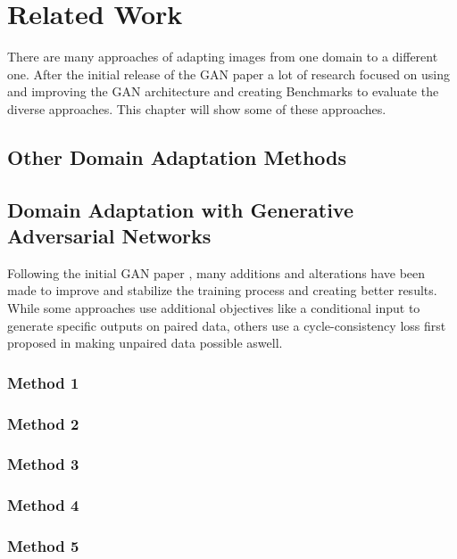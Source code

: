 \chapter{Related Work}
\label{sec:related_work}

There are many approaches of adapting images from one domain to a different one. After the initial release of the GAN paper \cite{NIPS2014_5423} a lot of research focused on using and improving the GAN architecture and creating Benchmarks to evaluate the diverse approaches. This chapter will show some of these approaches.

\section{Other Domain Adaptation Methods}


\section{Domain Adaptation with Generative Adversarial Networks}
Following the initial GAN paper \cite{NIPS2014_5423}, many additions and alterations have been made to improve and stabilize the training process and creating better results. While some approaches use additional objectives like a conditional input to generate specific outputs \cite{DBLP:journals/corr/IsolaZZE16} on paired data, others use a cycle-consistency loss first proposed in \cite{DBLP:journals/corr/ZhuPIE17} making unpaired data possible aswell. 


\subsection{Method 1}

\subsection{Method 2}

\subsection{Method 3}

\subsection{Method 4}

\subsection{Method 5}